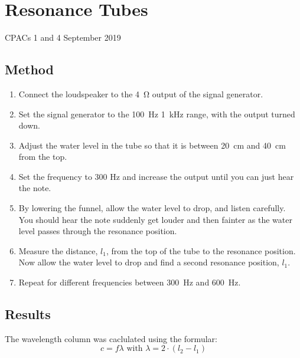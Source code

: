\section{Resonance Tubes}
CPACs 1 and 4
\hfill
{} September 2019

\subsection{Method}
\begin{enumerate}
  \item Connect the loudspeaker to the \SI{4}{\ohm} output of the signal generator.
  \item Set the signal generator to the \SI{100}{\hertz} \text{-} \SI{1}{\kilo\hertz} range, with the output turned
down.
  \item Adjust the water level in the tube so that it is between \SI{20}{\centi\metre} and \SI{40}{\centi\metre} from the top.
  \item Set the frequency to 300 Hz and increase the output until you can just hear the note.
  \item By lowering the funnel, allow the water level to drop, and listen carefully. You should hear
the note suddenly get louder and then fainter as the water level passes through the
resonance position.
  \item Measure the distance, $l_{1}$, from the top of the tube to the resonance position. Now allow
the water level to drop and find a second resonance position, $l_{1}$.
  \item Repeat for different frequencies between \SI{300}{\hertz} and \SI{600}{\hertz}.
\end{enumerate}

\subsection{Results}
The wavelength column was caclulated using the formular:
\begin{equation}
  c = f \lambda \text{ with } \lambda = 2 \cdot (l_2-l_1)
\end{equation}
\begin{center}
\end{center}

